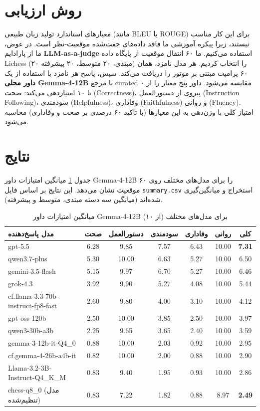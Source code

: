 \documentclass[a4paper,12pt]{report}
\begin{document}
\section{روش ارزیابی}
معیارهای استاندارد تولید زبان طبیعی (مانند BLEU یا ROUGE) برای این کار مناسب نیستند، زیرا پیکره آموزشی ما فاقد داده‌های جفت‌شده موقعیت-نظر است. در عوض، ما از پارادایم \textbf{LLM-as-a-judge} استفاده می‌کنیم.
ما ۶۰ انتقال موقعیت از پایگاه داده Lichess (۲۰ مبتدی، ۲۰ متوسط، ۲۰ پیشرفته) را انتخاب کردیم. هر مدل نامزد، همان ۶۰ پرامپت مبتنی بر موتور را دریافت می‌کند. سپس، پاسخ هر نامزد با استفاده از یک \textbf{داور محلی Gemma-4-12B} با مرجع curated مقایسه می‌شود. داور پنج معیار را از ۰ تا ۱۰ امتیازدهی می‌کند: صحت (Correctness)، پیروی از دستورالعمل (Instruction Following)، سودمندی (Helpfulness)، وفاداری (Faithfulness) و روانی (Fluency). امتیاز کلی با وزن‌دهی به این معیارها (با تاکید ۶۰ درصدی بر صحت و وفاداری) محاسبه می‌شود.

\section{نتایج}
جدول \ref{tab:judge-results} میانگین امتیازات داور Gemma-4-12B را برای مدل‌های مختلف روی ۶۰ موقعیت نشان می‌دهد. این نتایج بر اساس فایل \texttt{summary.csv} استخراج و میانگین‌گیری شده‌اند (میانگین سه دسته مبتدی، متوسط و پیشرفته).

\begin{table}[htbp]
\centering
\caption{میانگین امتیازات داور Gemma-4-12B برای مدل‌های مختلف (از ۱۰)}
\label{tab:judge-results}
\begin{tabular}{@{}lcccccc@{}}
\toprule
\textbf{مدل پاسخ‌دهنده} & \textbf{صحت} & \textbf{دستورالعمل} & \textbf{سودمندی} & \textbf{وفاداری} & \textbf{روانی} & \textbf{کلی} \\
\midrule
gpt-5.5 & 6.28 & 9.85 & 7.57 & 6.43 & 10.00 & \textbf{7.31} \\
qwen3.7-plus & 5.30 & 10.00 & 6.63 & 5.27 & 10.00 & 6.50 \\
gemini-3.5-flash & 5.15 & 9.97 & 6.70 & 5.27 & 10.00 & 6.46 \\
grok-4.3 & 3.92 & 9.90 & 5.27 & 4.08 & 10.00 & 5.44 \\
cf.llama-3.3-70b-instruct-fp8-fast & 2.60 & 9.80 & 4.00 & 3.10 & 10.00 & 4.12 \\
gpt-oss-120b & 2.50 & 10.00 & 3.85 & 2.50 & 10.00 & 3.97 \\
qwen3-30b-a3b & 2.25 & 9.65 & 3.65 & 2.40 & 10.00 & 3.59 \\
gemma-3-12b-it-Q4\_0 & 0.88 & 10.00 & 2.03 & 0.92 & 10.00 & 2.95 \\
cf.gemma-4-26b-a4b-it & 0.82 & 10.00 & 2.00 & 0.88 & 10.00 & 2.90 \\
Llama-3.2-3B-Instruct-Q4\_K\_M & 0.83 & 9.40 & 1.95 & 0.93 & 10.00 & 2.86 \\
chess-q8\_0 (مدل تنظیم‌شده) & 0.83 & 7.22 & 1.82 & 0.88 & 8.97 & \textbf{2.49} \\
\bottomrule
\end{tabular}
\end{table}
\end{document}
